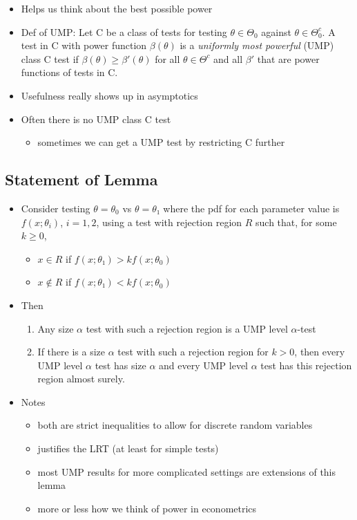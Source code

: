 \begin{itemize}
\item Helps us think about the best possible power
\item Def of UMP: Let C be a class of tests for testing $θ ∈ Θ_0$
  against $θ ∈ Θ_0^c$.  A test in C with power function $β(θ)$ is a
  \emph{uniformly most powerful} (UMP) class C test if $β(θ) ≥ β'(θ)$
  for all $θ ∈ Θ^c$ and all $β'$ that are power functions of tests in
  C.
\item Usefulness really shows up in asymptotics
\item Often there is no UMP class C test
\begin{itemize}
\item sometimes we can get a UMP test by restricting C further
\end{itemize}
\end{itemize}

\subsection{Statement of Lemma}

\begin{itemize}
\item Consider testing $θ = θ_0$ vs $θ = θ₁$ where the pdf for each
  parameter value is $f(x; θ_i)$, $i = 1,2$, using a test with
  rejection region $R$ such that, for some $k ≥ 0$,
\begin{itemize}
\item $x ∈ R$ if $f(x; θ₁) > k f(x; θ_0)$
\item $x ∉ R$ if $f(x; θ₁) < k f(x; θ_0)$
\end{itemize}
\item Then
\begin{enumerate}
\item Any size $α$ test with such a rejection region is a UMP level $α$-test
\item If there is a size $α$ test with such a rejection region for $k
  > 0$, then every UMP level $α$ test has size $α$ and every UMP level
  $α$ test has this rejection region almost surely.
\end{enumerate}
\item Notes
\begin{itemize}
\item both are strict inequalities to allow for discrete random
         variables
\item justifies the LRT (at least for simple tests)
\item most UMP results for more complicated settings are extensions
         of this lemma
\item more or less how we think of power in econometrics
\end{itemize}
\end{itemize}

